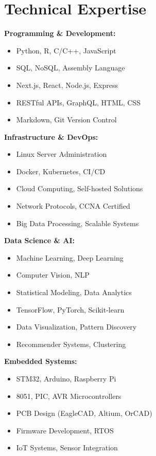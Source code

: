 \documentclass[11pt,a4paper]{article}
\begin{document}
\section{Technical Expertise}
\begin{multicols}{2}
\small
\textbf{Programming \& Development:}
\begin{itemize}[leftmargin=15pt, noitemsep, topsep=1pt]
    \item Python, R, C/C++, JavaScript
    \item SQL, NoSQL, Assembly Language
    \item Next.js, React, Node.js, Express
    \item RESTful APIs, GraphQL, HTML, CSS
    \item Markdown, Git Version Control
\end{itemize}

\textbf{Infrastructure \& DevOps:}
\begin{itemize}[leftmargin=15pt, noitemsep, topsep=1pt]
    \item Linux Server Administration
    \item Docker, Kubernetes, CI/CD
    \item Cloud Computing, Self-hosted Solutions
    \item Network Protocols, CCNA Certified
    \item Big Data Processing, Scalable Systems
\end{itemize}

\textbf{Data Science \& AI:}
\begin{itemize}[leftmargin=15pt, noitemsep, topsep=1pt]
    \item Machine Learning, Deep Learning
    \item Computer Vision, NLP
    \item Statistical Modeling, Data Analytics
    \item TensorFlow, PyTorch, Scikit-learn
    \item Data Visualization, Pattern Discovery
    \item Recommender Systems, Clustering
\end{itemize}

\textbf{Embedded Systems:}
\begin{itemize}[leftmargin=15pt, noitemsep, topsep=1pt]
    \item STM32, Arduino, Raspberry Pi
    \item 8051, PIC, AVR Microcontrollers
    \item PCB Design (EagleCAD, Altium, OrCAD)
    \item Firmware Development, RTOS
    \item IoT Systems, Sensor Integration
\end{itemize}


\end{multicols}
\end{document}
